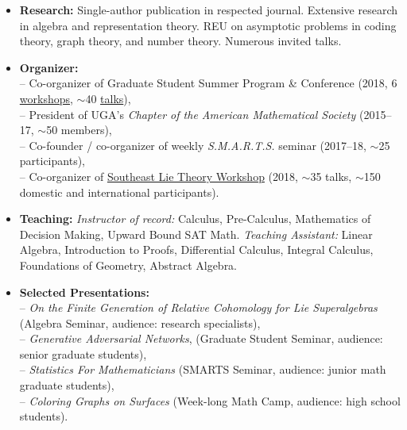 \documentclass[10pt,a4paper]{article}
\begin{document}
{
\begin{itemize}
\item \textbf{Research:} Single-author publication in respected journal. Extensive research in algebra and representation theory. REU on asymptotic problems in coding theory, graph theory, and number theory. Numerous invited talks.
\item \textbf{Organizer:}
  \\ \null \hspace{0.2em} -- Co-organizer of Graduate Student Summer Program \& Conference (2018, 6 \href{https://research.franklin.uga.edu/agant/professional-development-summer-2018}{workshops}, $\sim$40 \href{https://research.franklin.uga.edu/agant/mock-ams-conference-2018}{talks}),
  \\ \null \hspace{0.2em} -- President of UGA's \emph{Chapter of the American Mathematical Society} (2015--17, $\sim$50 members),
  \\ \null \hspace{0.2em} -- Co-founder / co-organizer of weekly \emph{S.M.A.R.T.S.} seminar (2017--18, $\sim$25 participants),
  \\ \null \hspace{0.2em} -- Co-organizer of \href{https://www.math.lsu.edu/~pramod/selie/10/}{Southeast Lie Theory Workshop} (2018, $\sim$35 talks, $\sim$150 domestic and international participants).
\item \textbf{Teaching:} \emph{Instructor of record:} Calculus, Pre-Calculus, Mathematics of Decision Making, Upward Bound SAT Math. \emph{Teaching Assistant:} Linear Algebra, Introduction to Proofs, Differential Calculus, Integral Calculus, Foundations of Geometry, Abstract Algebra.
\item \textbf{Selected Presentations:}
  \\ \null \hspace{0.2em}  -- \emph{On the Finite Generation of Relative Cohomology for Lie Superalgebras} (Algebra Seminar, audience: research specialists),
  \\ \null \hspace{0em} -- \emph{Generative Adversarial Networks}, (Graduate Student Seminar, audience: senior graduate students),
  \\ \null \hspace{0em} -- \emph{Statistics For Mathematicians} (SMARTS Seminar, audience: junior math graduate students),
  \\ \null \hspace{0em} -- \emph{Coloring Graphs on Surfaces} (Week-long Math Camp, audience: high school students).


\end{itemize}}
\end{document}
